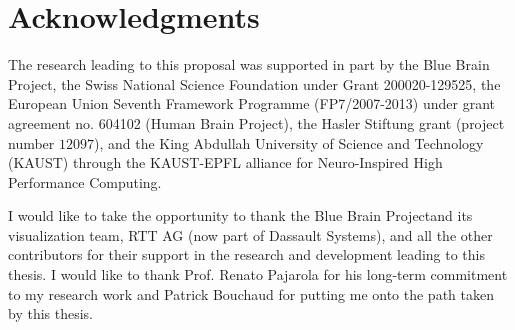 

\chapter*{Acknowledgments}
The research leading to this proposal was supported in part by the Blue Brain
Project, the Swiss National Science Foundation under Grant 200020-129525, the
European Union Seventh Framework Programme (FP7/2007-2013) under grant agreement
no. 604102 (Human Brain Project), the Hasler Stiftung grant (project number
$12097$), and the King Abdullah University of Science and Technology (KAUST)
through the KAUST-EPFL alliance for Neuro-Inspired High Performance Computing.

I would like to take the opportunity to thank the Blue Brain Projectand its
visualization team, RTT AG (now part of Dassault Systems), and all the other
contributors for their support in the research and development leading to this
thesis. I would like to thank Prof. Renato Pajarola for his long-term
commitment to my research work and Patrick Bouchaud for putting me onto the
path taken by this thesis.
